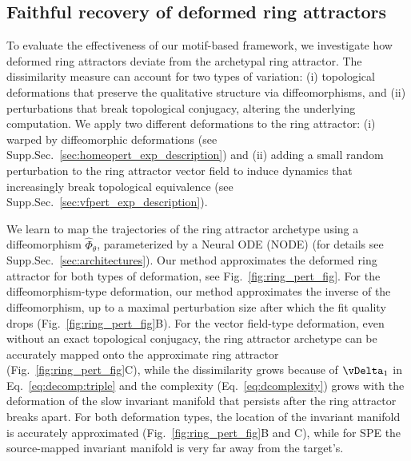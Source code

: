 \documentclass{article}
\theoremstyle{definition} \newtheorem{definition}{Definition}  \newtheorem{example}{Example}
\theoremstyle{remark} \newtheorem{remark}{Remark}
\newcounter{ct}
\newcommand{\homeo}{\Phi} %
\begin{document}
\subsection{Faithful recovery of deformed ring attractors}\label{sec:imp_ring}
To evaluate the effectiveness of our motif-based framework, we investigate how deformed ring attractors deviate from the archetypal ring attractor. 
The dissimilarity measure can account for two types of variation: 
(i) topological deformations that preserve the qualitative structure via diffeomorphisms, and 
(ii) perturbations that break topological conjugacy, altering the underlying computation.
%
We apply two different deformations to the ring attractor:
(i) warped by diffeomorphic deformations (see Supp.Sec.~\ref{sec:homeopert_exp_description}) and 
(ii) adding a small random perturbation to the ring attractor vector field to induce dynamics that increasingly break topological equivalence (see Supp.Sec.~\ref{sec:vfpert_exp_description}).


We learn to map the trajectories of the ring attractor archetype using a  diffeomorphism \( \hat{\homeo}_\theta \), parameterized by a Neural ODE (NODE) \citep{chen2018neural} (for details see Supp.Sec.~\ref{sec:architectures}).
Our method approximates the deformed ring attractor for both types of deformation, see Fig.~\ref{fig:ring_pert_fig}.
For the diffeomorphism-type deformation, our method approximates the inverse of the diffeomorphism, up to a maximal perturbation size after which the fit quality drops (Fig.~\ref{fig:ring_pert_fig}B).
For the vector field-type deformation, even without an exact topological conjugacy, the ring attractor archetype can be accurately mapped onto the approximate ring attractor (Fig.~\ref{fig:ring_pert_fig}C), while the dissimilarity grows because of $\vDelta_1$ in Eq.~\ref{eq:decomp:triple} and the complexity (Eq.~\ref{eq:dcomplexity}) grows with the deformation of the slow invariant manifold that persists after the ring attractor breaks apart.
For both deformation types, the location of the invariant manifold is accurately approximated (Fig.~\ref{fig:ring_pert_fig}B and C), while for SPE the source-mapped invariant manifold is very far away from the target's.
\end{document}
